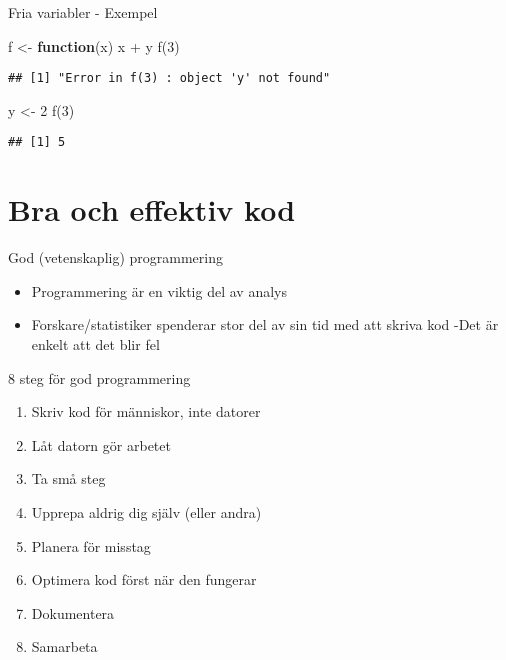 \documentclass[
  11pt,
  ignorenonframetext,
]{beamer}
\newenvironment{Shaded}{\begin{snugshade}}{\end{snugshade}}
\newcommand{\ControlFlowTok}[1]{\textcolor[rgb]{0.13,0.29,0.53}{\textbf{#1}}}
\newcommand{\DecValTok}[1]{\textcolor[rgb]{0.00,0.00,0.81}{#1}}
\newcommand{\FunctionTok}[1]{\textcolor[rgb]{0.00,0.00,0.00}{#1}}
\newcommand{\NormalTok}[1]{#1}
\newcommand{\OtherTok}[1]{\textcolor[rgb]{0.56,0.35,0.01}{#1}}
\newcommand{\SpecialCharTok}[1]{\textcolor[rgb]{0.00,0.00,0.00}{#1}}
\providecommand{\tightlist}{%
  \setlength{\itemsep}{0pt}\setlength{\parskip}{0pt}}
\begin{document}
\begin{frame}[fragile]{Fria variabler - Exempel}
\protect\hypertarget{fria-variabler---exempel}{}
\begin{Shaded}
\begin{Highlighting}[]
\NormalTok{f }\OtherTok{\textless{}{-}} \ControlFlowTok{function}\NormalTok{(x) x }\SpecialCharTok{+}\NormalTok{ y}
\FunctionTok{f}\NormalTok{(}\DecValTok{3}\NormalTok{)}
\end{Highlighting}
\end{Shaded}

\begin{verbatim}
## [1] "Error in f(3) : object 'y' not found"
\end{verbatim}

\begin{Shaded}
\begin{Highlighting}[]
\NormalTok{y }\OtherTok{\textless{}{-}} \DecValTok{2}
\FunctionTok{f}\NormalTok{(}\DecValTok{3}\NormalTok{)}
\end{Highlighting}
\end{Shaded}

\begin{verbatim}
## [1] 5
\end{verbatim}
\end{frame}

\hypertarget{bra-och-effektiv-kod}{%
\section{Bra och effektiv kod}\label{bra-och-effektiv-kod}}

\begin{frame}{God (vetenskaplig) programmering}
\protect\hypertarget{god-vetenskaplig-programmering}{}
\begin{itemize}
\tightlist
\item
  Programmering är en viktig del av analys
\item
  Forskare/statistiker spenderar stor del av sin tid med att skriva kod
  -Det är enkelt att det blir fel
\end{itemize}
\end{frame}

\begin{frame}{8 steg för god programmering}
\protect\hypertarget{steg-fuxf6r-god-programmering}{}
\begin{enumerate}
\tightlist
\item
  Skriv kod för människor, inte datorer
\item
  Låt datorn gör arbetet
\item
  Ta små steg
\item
  Upprepa aldrig dig själv (eller andra)
\item
  Planera för misstag
\item
  Optimera kod först när den fungerar
\item
  Dokumentera
\item
  Samarbeta
\end{enumerate}
\end{frame}
\end{document}
